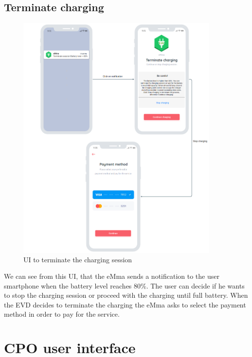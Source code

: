 \subsection{Terminate charging}
\begin{figure}[H]
    \centering
    \includegraphics[width=0.9\textwidth]{Images/cp3/terminateCharging.png}
    \caption{UI to terminate the charging session}
\end{figure}
We can see from this UI, that the eMma sends a notification to the user smartphone when the battery level reaches 80\%. The user can decide if he wants to stop the charging session or proceed with the charging until full battery. When the EVD decides to terminate the charging the eMma asks to select the payment method in order to pay for the service.

\clearpage
\section{CPO user interface}